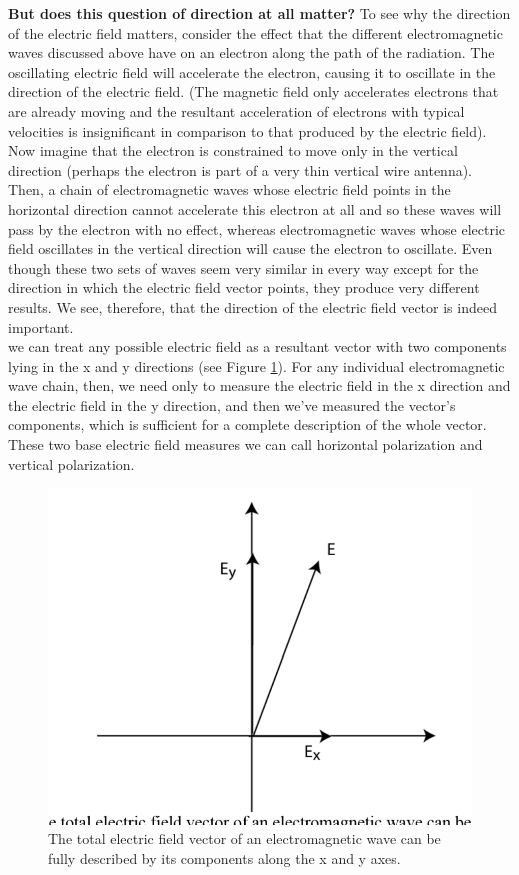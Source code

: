 \documentclass[10pt]{report}
\begin{document}
 \textbf{But does this question of direction at all matter?}
To see why the direction of the electric field matters, consider the effect that the different electromagnetic waves discussed above have on an electron along the path of the radiation.  The oscillating electric field will accelerate the electron, causing it to oscillate in the direction of the electric field.  (The magnetic field only accelerates electrons that are already moving and the resultant acceleration of electrons with typical velocities is insignificant in comparison to that produced by the electric field).  Now imagine that the electron is constrained to move only in the vertical direction (perhaps the electron is part of a very thin vertical wire antenna).  Then, a chain of electromagnetic waves whose electric field points in the horizontal direction cannot accelerate this electron at all and so these waves will pass by the electron with no effect, whereas electromagnetic waves whose electric field oscillates in the vertical direction will cause the electron to oscillate.  Even though these two sets of waves seem very similar in every way except for the direction in which the electric field vector points, they produce very different results.  We see, therefore, that the direction of the electric field vector is indeed important. \\
 we can treat any possible electric field as a resultant vector with two components lying in the x and y directions (see Figure \ref{figpol}).  For any individual electromagnetic wave chain, then, we need only to measure the electric field in the x direction and the electric field in the y direction, and then we've measured the vector's components, which is sufficient for a complete description of the whole vector.  These two base electric field measures we can call horizontal polarization and vertical polarization. 
 \begin{figure}\label{figpol}
 \includegraphics[width=\linewidth]{figpol.png}
 \caption{ The total electric field vector of an electromagnetic wave can be fully described by its components along the x and y axes. }
 \end{figure}
 
\end{document}
